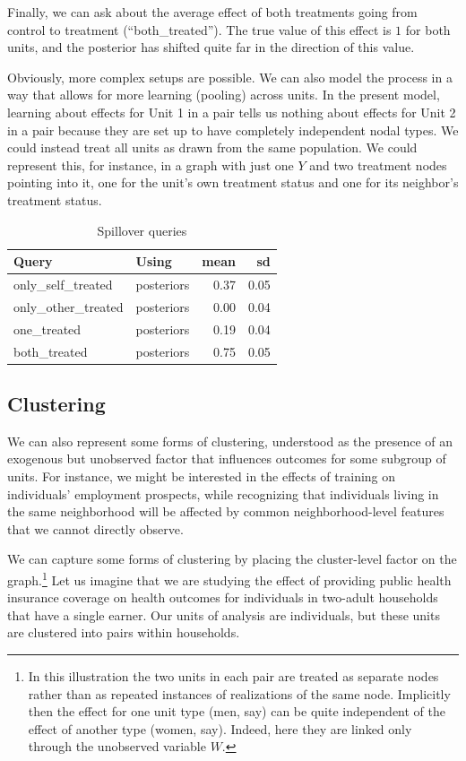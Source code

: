 \documentclass[
  12pt,
]{book}
\begin{document}
Finally, we can ask about the average effect of both treatments going from control to treatment (``both\_treated''). The true value of this effect is \(1\) for both units, and the posterior has shifted quite far in the direction of this value.

Obviously, more complex setups are possible. We can also model the process in a way that allows for more learning (pooling) across units. In the present model, learning about effects for Unit 1 in a pair tells us nothing about effects for Unit 2 in a pair because they are set up to have completely independent nodal types. We could instead treat all units as drawn from the same population. We could represent this, for instance, in a graph with just one \(Y\) and two treatment nodes pointing into it, one for the unit's own treatment status and one for its neighbor's treatment status.

\begin{table}

\caption{\label{tab:unnamed-chunk-20}Spillover queries}
\centering
\begin{tabular}[t]{llrr}
\toprule
Query & Using & mean & sd\\
\midrule
only\_self\_treated & posteriors & 0.37 & 0.05\\
only\_other\_treated & posteriors & 0.00 & 0.04\\
one\_treated & posteriors & 0.19 & 0.04\\
both\_treated & posteriors & 0.75 & 0.05\\
\bottomrule
\end{tabular}
\end{table}

\hypertarget{clustering}{%
\subsection{Clustering}\label{clustering}}

We can also represent some forms of clustering, understood as the presence of an exogenous but unobserved factor that influences outcomes for some subgroup of units. For instance, we might be interested in the effects of training on individuals' employment prospects, while recognizing that individuals living in the same neighborhood will be affected by common neighborhood-level features that we cannot directly observe.

We can capture some forms of clustering by placing the cluster-level factor on the graph.\footnote{In this illustration the two units in each pair are treated as separate nodes rather than as repeated instances of realizations of the same node. Implicitly then the effect for one unit type (men, say) can be quite independent of the effect of another type (women, say). Indeed, here they are linked only through the unobserved variable \(W\).} Let us imagine that we are studying the effect of providing public health insurance coverage on health outcomes for individuals in two-adult households that have a single earner. Our units of analysis are individuals, but these units are clustered into pairs within households.
\end{document}

